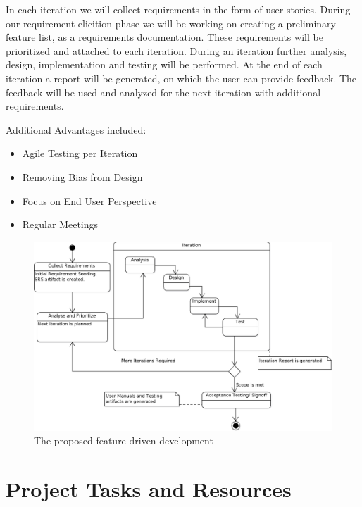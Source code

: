 \documentclass{journal}
\begin{document}
In each iteration we will collect requirements in the form of user stories. During our requirement elicition phase we will be working on creating a preliminary feature list, as a requirements documentation. These requirements will be 
prioritized and attached to each iteration. During an iteration further analysis, design, implementation and testing will be performed. At the end of each iteration a report will be generated, on which the user can provide feedback. The
feedback will be used and analyzed for the next iteration with additional requirements.

Additional Advantages included:
\begin{itemize}

\item{Agile Testing per Iteration}
\item{Removing Bias from Design}
\item{Focus on End User Perspective}
\item{Regular Meetings}

\end{itemize}

\begin{figure}[!h]
\begin{center}
\includegraphics[width=18cm]{images/Methodology} \caption{ The proposed feature driven development } \label{fig:methods}

\end{center}
\end{figure}

\section{Project Tasks and Resources}
\end{document}
